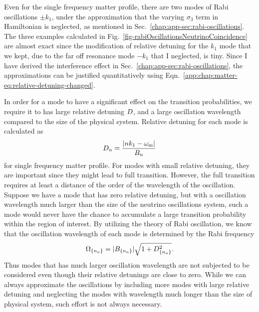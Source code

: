 Even for the single frequency matter profile, there are two modes of Rabi oscillations $\pm k_1$, under the approximation that the varying $\sigma_3$ term in Hamiltonian is neglected, as mentioned in Sec.~\ref{chap:app-sec:rabi-oscillations}. The three examples calculated in Fig.~\ref{fig-rabiOscillationsNeutrinoCoincidence} are almost exact since the modification of relative detuning for the $k_1$ mode that we kept, due to the far off resonance mode $-k_1$ that I neglected, is tiny. Since I have derived the interference effect in Sec.~\ref{chap:app-sec:rabi-oscillations}, the approximations can be justified quantitatively using Eqn.~\ref{app:chap:matter-eq:relative-detuning-changed}.

In order for a mode to have a significant effect on the transition probabilities, we require it to has large relative detuning $D$, and a large oscillation wavelength compared to the size of the physical system. Relative detuning for each mode is calculated as
\begin{equation}
D_n = \frac{\lvert n k_1 - \omega_{\mathrm{m}} \rvert}{B_n}
\end{equation}
for single frequency matter profile.
For modes with small relative detuning, they are important since they might lead to full transition. However, the full transition requires at least a distance of the order of the wavelength of the oscillation. Suppose we have a mode that has zero relative detuning, but with a oscillation wavelength much larger than the size of the neutrino oscillations system, such a mode would never have the chance to accumulate a large transition probability within the region of interest. By utilizing the theory of Rabi oscillation, we know that the oscillation wavelength of each mode is determined by the Rabi frequency
\begin{equation}
\Omega_{\{n_a\}} = \lvert B_{\{n_a\}} \rvert \sqrt{1+D_{\{n_a\}}^2}.
\end{equation}
Thus modes that has much larger oscillation wavelength are not subjected to be considered even though their relative detunings are close to zero. While we can always approximate the oscillations by including more modes with large relative detuning and neglecting the modes with wavelength much longer than the size of physical system, such effort is not always necessary.


